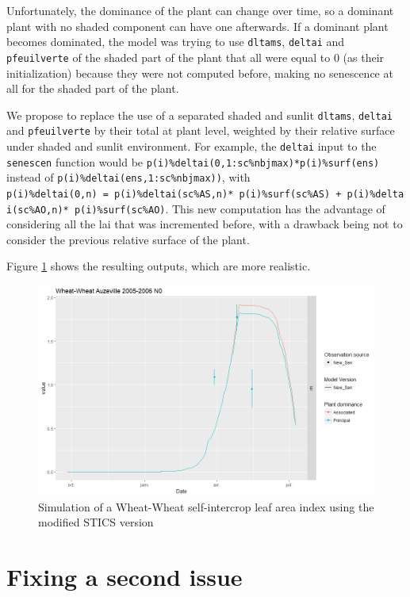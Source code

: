\documentclass[]{book}
\begin{document}
Unfortunately, the dominance of the plant can change over time, so a dominant plant with no shaded component can have one afterwards. If a dominant plant becomes dominated, the model was trying to use \texttt{dltams}, \texttt{deltai} and \texttt{pfeuilverte} of the shaded part of the plant that all were equal to 0 (as their initialization) because they were not computed before, making no senescence at all for the shaded part of the plant.

We propose to replace the use of a separated shaded and sunlit \texttt{dltams}, \texttt{deltai} and \texttt{pfeuilverte} by their total at plant level, weighted by their relative surface under shaded and sunlit environment. For example, the \texttt{deltai} input to the \texttt{senescen} function would be \texttt{p(i)\%deltai(0,1:sc\%nbjmax)*p(i)\%surf(ens)} instead of \texttt{p(i)\%deltai(ens,1:sc\%nbjmax))}, with \texttt{p(i)\%deltai(0,n)\ =\ p(i)\%deltai(sc\%AS,n)*\ p(i)\%surf(sc\%AS)\ +\ p(i)\%deltai(sc\%AO,n)*\ p(i)\%surf(sc\%AO)}. This new computation has the advantage of considering all the lai that was incremented before, with a drawback being not to consider the previous relative surface of the plant.

Figure \ref{fig:Newsen} shows the resulting outputs, which are more realistic.

\begin{figure}
\centering
\includegraphics{img/Newsen.png}
\caption{\label{fig:Newsen}Simulation of a Wheat-Wheat self-intercrop leaf area index using the modified STICS version}
\end{figure}

\hypertarget{fixing-a-second-issue}{%
\section{Fixing a second issue}\label{fixing-a-second-issue}}
\end{document}
